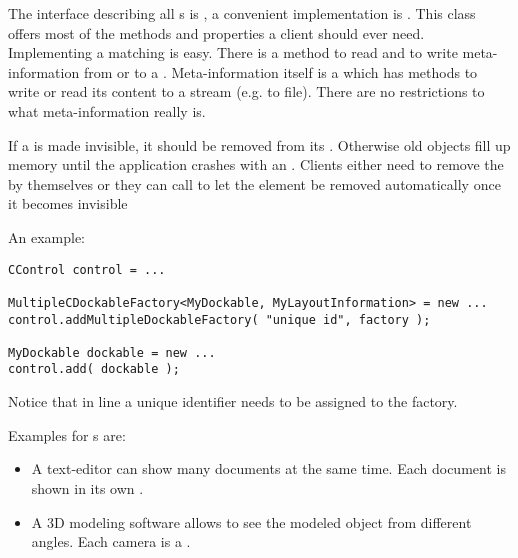 The interface describing all s is , a convenient implementation is . This class offers most of the methods and properties a client should ever need.
Implementing a matching  is easy. There is a method to read and to write meta-information from or to a . Meta-information itself is a  which has methods to write or read its content to a stream (e.g. to file). There are no restrictions to what meta-information really is.

If a  is made invisible, it should be removed from its \linebreak {}. Otherwise old objects fill up memory until the application crashes with an . Clients either need to remove the  by themselves or they can call  to let the element be removed automatically once it becomes invisible



An example:
\begin{lstlisting}
CControl control = ...

MultipleCDockableFactory<MyDockable, MyLayoutInformation> = new ...
control.addMultipleDockableFactory( "unique id", factory );

MyDockable dockable = new ...
control.add( dockable );
\end{lstlisting}
Notice that in line  a unique identifier needs to be assigned to the factory.


Examples for s are:
\begin{itemize}
 \item A text-editor can show many documents at the same time. Each document is shown in its own .
 \item A 3D modeling software allows to see the modeled object from different angles. Each camera is a .
\end{itemize}

